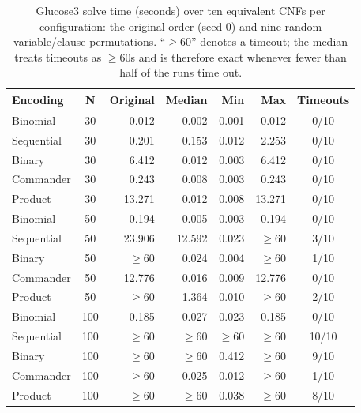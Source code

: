 \documentclass[a4paper,fleqn]{cas-sc}
\begin{document}
\begin{table}[htbp]
    \centering
    \renewcommand{\arraystretch}{1.08}
    \caption{Glucose3 solve time (seconds) over ten equivalent CNFs per configuration: the original order (seed $0$) and nine random variable/clause permutations. ``$\geq 60$'' denotes a timeout; the median treats timeouts as $\geq 60$s and is therefore exact whenever fewer than half of the runs time out.}
    \label{tab:ordering}
    \begin{tabular}{l c r r r r c}
        \toprule
        \rowcolor{rowtint}
        \textbf{Encoding} & \textbf{N} & \textbf{Original} & \textbf{Median} & \textbf{Min} & \textbf{Max} & \textbf{Timeouts} \\
        \midrule
        Binomial   & 30 & 0.012 & 0.002 & 0.001 & 0.012 & 0/10 \\
        Sequential & 30 & 0.201 & 0.153 & 0.012 & 2.253 & 0/10 \\
        Binary     & 30 & 6.412 & 0.012 & 0.003 & 6.412 & 0/10 \\
        Commander  & 30 & 0.243 & 0.008 & 0.003 & 0.243 & 0/10 \\
        Product    & 30 & 13.271 & 0.012 & 0.008 & 13.271 & 0/10 \\
        \midrule
        Binomial   & 50 & 0.194 & 0.005 & 0.003 & 0.194 & 0/10 \\
        Sequential & 50 & 23.906 & 12.592 & 0.023 & {$\geq 60$} & 3/10 \\
        Binary     & 50 & {$\geq 60$} & 0.024 & 0.004 & {$\geq 60$} & 1/10 \\
        Commander  & 50 & 12.776 & 0.016 & 0.009 & 12.776 & 0/10 \\
        Product    & 50 & {$\geq 60$} & 1.364 & 0.010 & {$\geq 60$} & 2/10 \\
        \midrule
        Binomial   & 100 & 0.185 & 0.027 & 0.023 & 0.185 & 0/10 \\
        Sequential & 100 & {$\geq 60$} & {$\geq 60$} & {$\geq 60$} & {$\geq 60$} & 10/10 \\
        Binary     & 100 & {$\geq 60$} & {$\geq 60$} & 0.412 & {$\geq 60$} & 9/10 \\
        Commander  & 100 & {$\geq 60$} & 0.025 & 0.012 & {$\geq 60$} & 1/10 \\
        Product    & 100 & {$\geq 60$} & {$\geq 60$} & 0.038 & {$\geq 60$} & 8/10 \\
        \bottomrule
    \end{tabular}
\end{table}
\end{document}
